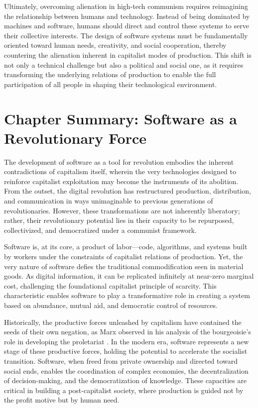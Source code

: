 \begin{refsection}
Ultimately, overcoming alienation in high-tech communism requires reimagining the relationship between humans and technology. Instead of being dominated by machines and software, humans should direct and control these systems to serve their collective interests. The design of software systems must be fundamentally oriented toward human needs, creativity, and social cooperation, thereby countering the alienation inherent in capitalist modes of production. This shift is not only a technical challenge but also a political and social one, as it requires transforming the underlying relations of production to enable the full participation of all people in shaping their technological environment.

\section{Chapter Summary: Software as a Revolutionary Force}

The development of software as a tool for revolution embodies the inherent contradictions of capitalism itself, wherein the very technologies designed to reinforce capitalist exploitation may become the instruments of its abolition. From the outset, the digital revolution has restructured production, distribution, and communication in ways unimaginable to previous generations of revolutionaries. However, these transformations are not inherently liberatory; rather, their revolutionary potential lies in their capacity to be repurposed, collectivized, and democratized under a communist framework.

Software is, at its core, a product of labor—code, algorithms, and systems built by workers under the constraints of capitalist relations of production. Yet, the very nature of software defies the traditional commodification seen in material goods. As digital information, it can be replicated infinitely at near-zero marginal cost, challenging the foundational capitalist principle of scarcity. This characteristic enables software to play a transformative role in creating a system based on abundance, mutual aid, and democratic control of resources.

Historically, the productive forces unleashed by capitalism have contained the seeds of their own negation, as Marx observed in his analysis of the bourgeoisie’s role in developing the proletariat \cite[pp.~82]{marx1848}. In the modern era, software represents a new stage of these productive forces, holding the potential to accelerate the socialist transition. Software, when freed from private ownership and directed toward social ends, enables the coordination of complex economies, the decentralization of decision-making, and the democratization of knowledge. These capacities are critical in building a post-capitalist society, where production is guided not by the profit motive but by human need.


\end{refsection}
